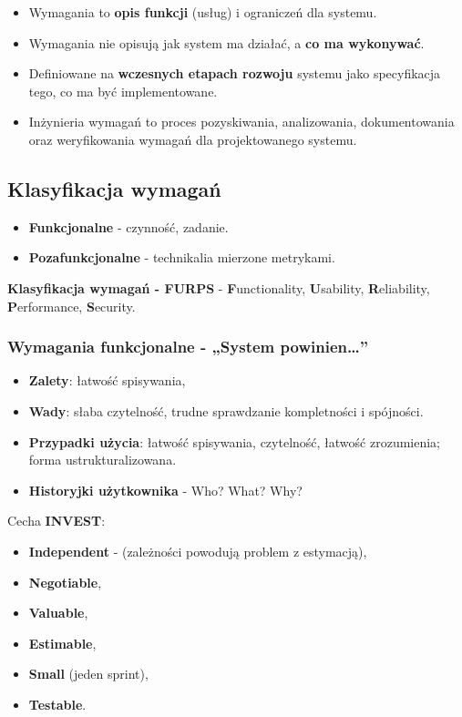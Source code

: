\documentclass[../main.tex]{subfiles}
\begin{document}
    \begin{itemize}
        \item Wymagania to \textbf{opis funkcji} (usług) i ograniczeń dla systemu.
        \item Wymagania nie opisują jak system ma działać, a \textbf{co ma
        wykonywać}.
        \item Definiowane na \textbf{wczesnych etapach rozwoju} systemu jako specyfikacja tego, co ma być
        implementowane.
        \item Inżynieria wymagań to proces pozyskiwania, analizowania, dokumentowania oraz weryfikowania
        wymagań dla projektowanego systemu.

    \end{itemize}

    \subsection{Klasyfikacja wymagań}
    \begin{itemize}
        \item \textbf{Funkcjonalne} - czynność, zadanie.
        \item \textbf{Pozafunkcjonalne} - technikalia mierzone metrykami.
    \end{itemize}

    \textbf{Klasyfikacja wymagań - FURPS} - \textbf{F}unctionality, \textbf{U}sability, \textbf{R}eliability,
    \textbf{P}erformance, \textbf{S}ecurity.

    \subsubsection{Wymagania funkcjonalne - „System powinien\dots”}
    \begin{itemize}
        \item \textbf{Zalety}: łatwość spisywania,
        \item \textbf{Wady}: słaba czytelność, trudne sprawdzanie kompletności i spójności.
        \item \textbf{Przypadki użycia}:  łatwość spisywania, czytelność, łatwość zrozumienia; forma ustrukturalizowana.
        \item \textbf{Historyjki użytkownika} - Who? What? Why?
    \end{itemize}

    Cecha \textbf{INVEST}:
    \begin{itemize}
        \item \textbf{Independent} - (zależności powodują problem z estymacją),
        \item \textbf{Negotiable},
        \item \textbf{Valuable},
        \item \textbf{Estimable},
        \item \textbf{Small} (jeden sprint),
        \item \textbf{Testable}.
    \end{itemize}
\end{document}
